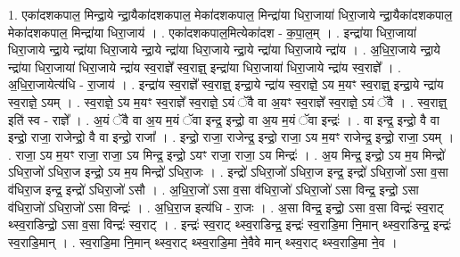 \documentclass[17pt]{extarticle}
\begin{document}
1. एका॑दशकपाल॒ मिन्द्रा॒ये न्द्रा॒यैका॑दशकपाल॒ मेका॑दशकपाल॒ मिन्द्रा॑या धिरा॒जाया॑ धिरा॒जाये न्द्रा॒यैका॑दशकपाल॒ मेका॑दशकपाल॒ मिन्द्रा॑या धिरा॒जाय॑ । . एका॑दशकपाल॒मित्येका॑दश - क॒पा॒ल॒म् । . इन्द्रा॑या धिरा॒जाया॑ धिरा॒जाये न्द्रा॒ये न्द्रा॑या धिरा॒जाये न्द्रा॒ये न्द्रा॑या धिरा॒जाये न्द्रा॒ये न्द्रा॑या धिरा॒जाये न्द्रा॑य । . अ॒धि॒रा॒जाये न्द्रा॒ये न्द्रा॑या धिरा॒जाया॑ धिरा॒जाये न्द्रा॑य स्व॒राज्ञे᳚ स्व॒राज्ञ्॒ इन्द्रा॑या धिरा॒जाया॑ धिरा॒जाये न्द्रा॑य स्व॒राज्ञे᳚ । . अ॒धि॒रा॒जायेत्य॑धि - रा॒जाय॑ । . इन्द्रा॑य स्व॒राज्ञे᳚ स्व॒राज्ञ्॒ इन्द्रा॒ये न्द्रा॑य स्व॒राज्ञे॒ ऽय म॒यꣳ स्व॒राज्ञ्॒ इन्द्रा॒ये न्द्रा॑य स्व॒राज्ञे॒ ऽयम् । . स्व॒राज्ञे॒ ऽय म॒यꣳ स्व॒राज्ञे᳚ स्व॒राज्ञे॒ ऽयं ॅवै वा अ॒यꣳ स्व॒राज्ञे᳚ स्व॒राज्ञे॒ ऽयं ॅवै । . स्व॒राज्ञ्॒ इति॑ स्व - राज्ञे᳚ । . अ॒यं ॅवै वा अ॒य म॒यं ॅवा इन्द्र॒ इन्द्रो॒ वा अ॒य म॒यं ॅवा इन्द्रः॑ । . वा इन्द्र॒ इन्द्रो॒ वै वा इन्द्रो॒ राजा॒ राजेन्द्रो॒ वै वा इन्द्रो॒ राजा᳚ । . इन्द्रो॒ राजा॒ राजेन्द्र॒ इन्द्रो॒ राजा॒ ऽय म॒यꣳ राजेन्द्र॒ इन्द्रो॒ राजा॒ ऽयम् । . राजा॒ ऽय म॒यꣳ राजा॒ राजा॒ ऽय मिन्द्र॒ इन्द्रो॒ ऽयꣳ राजा॒ राजा॒ ऽय मिन्द्रः॑ । . अ॒य मिन्द्र॒ इन्द्रो॒ ऽय म॒य मिन्द्रो॑ ऽधिरा॒जो॑ ऽधिरा॒ज इन्द्रो॒ ऽय म॒य मिन्द्रो॑ ऽधिरा॒जः । . इन्द्रो॑ ऽधिरा॒जो॑ ऽधिरा॒ज इन्द्र॒ इन्द्रो॑ ऽधिरा॒जो॑ ऽसा व॒सा व॑धिरा॒ज इन्द्र॒ इन्द्रो॑ ऽधिरा॒जो॑ ऽसौ । . अ॒धि॒रा॒जो॑ ऽसा व॒सा व॑धिरा॒जो॑ ऽधिरा॒जो॑ ऽसा विन्द्र॒ इन्द्रो॒ ऽसा व॑धिरा॒जो॑ ऽधिरा॒जो॑ ऽसा विन्द्रः॑ । . अ॒धि॒रा॒ज इत्य॑धि - रा॒जः । . अ॒सा विन्द्र॒ इन्द्रो॒ ऽसा व॒सा विन्द्रः॑ स्व॒राट् थ्स्व॒राडिन्द्रो॒ ऽसा व॒सा विन्द्रः॑ स्व॒राट् । . इन्द्रः॑ स्व॒राट् थ्स्व॒राडिन्द्र॒ इन्द्रः॑ स्व॒राडि॒मा नि॒मान् थ्स्व॒राडिन्द्र॒ इन्द्रः॑ स्व॒राडि॒मान् । . स्व॒राडि॒मा नि॒मान् थ्स्व॒राट् थ्स्व॒राडि॒मा ने॒वैवे मान् थ्स्व॒राट् थ्स्व॒राडि॒मा ने॒व । \newline
\end{document}
